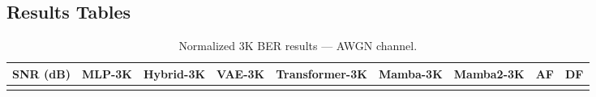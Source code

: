 \subsection{Results Tables}\label{sec:results-tables-2}

\begin{longtable}[]{@{}
  >{\raggedright\arraybackslash}p{}
  >{\raggedright\arraybackslash}p{}
  >{\raggedright\arraybackslash}p{}
  >{\raggedright\arraybackslash}p{}
  >{\raggedright\arraybackslash}p{}
  >{\raggedright\arraybackslash}p{}
  >{\raggedright\arraybackslash}p{}
  >{\raggedright\arraybackslash}p{}
  >{\raggedright\arraybackslash}p{}@{}}
\caption{Normalized 3K BER results --- AWGN channel.}\label{tbl:table7}\tabularnewline
\toprule\noalign{}
\begin{minipage}[b]{\linewidth}\raggedright
SNR (dB)
\end{minipage} & \begin{minipage}[b]{\linewidth}\raggedright
MLP-3K
\end{minipage} & \begin{minipage}[b]{\linewidth}\raggedright
Hybrid-3K
\end{minipage} & \begin{minipage}[b]{\linewidth}\raggedright
VAE-3K
\end{minipage} & \begin{minipage}[b]{\linewidth}\raggedright
Transformer-3K
\end{minipage} & \begin{minipage}[b]{\linewidth}\raggedright
Mamba-3K
\end{minipage} & \begin{minipage}[b]{\linewidth}\raggedright
Mamba2-3K
\end{minipage} & \begin{minipage}[b]{\linewidth}\raggedright
AF
\end{minipage} & \begin{minipage}[b]{\linewidth}\raggedright
DF
\end{minipage} \\
\midrule\noalign{}
\endfirsthead
\toprule\noalign{}
\begin{minipage}[b]{\linewidth}\raggedright

\end{minipage}
\end{longtable}
